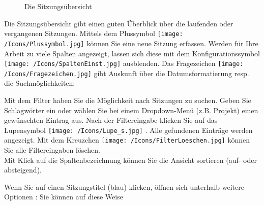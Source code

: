 \begin{figure}[H]
\caption{Die Sitzungsübersicht}
\end{figure}

Die Sitzungsübersicht gibt einen guten Überblick über die laufenden oder vergangenen Sitzungen. Mittels dem Plussymbol \texttt{[image: /Icons/Plussymbol.jpg]}  können Sie eine neue Sitzung erfassen. Werden für Ihre Arbeit zu viele Spalten angezeigt, lassen sich diese mit dem Konfigurationssymbol \texttt{[image: /Icons/SpaltenEinst.jpg]}  ausblenden. Das Fragezeichen \texttt{[image: /Icons/Fragezeichen.jpg]}  gibt Auskunft über die Datumsformatierung resp. die Suchmöglichkeiten: 

\begin{figure}[H]
\end{figure}

Mit dem Filter haben Sie die Möglichkeit nach Sitzungen zu suchen. Geben Sie Schlagwörter ein oder wählen Sie bei einem Dropdown-Menü (z.B. Projekt) einen gewünschten Eintrag aus. Nach der Filtereingabe klicken Sie auf das Lupensymbol \texttt{[image: /Icons/Lupe\_s.jpg]} . Alle gefundenen Einträge werden angezeigt. Mit dem Kreuzchen \texttt{[image: /Icons/FilterLoeschen.jpg]}  können Sie alle Filtereingaben löschen. \\
Mit Klick auf die Spaltenbezeichnung können Sie die Ansicht sortieren (auf- oder absteigend).

Wenn Sie auf einen Sitzungstitel (blau) klicken, öffnen sich unterhalb weitere Optionen : Sie können auf diese Weise

